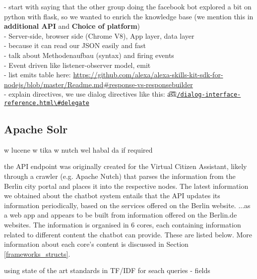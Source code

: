	- start with saying that the other group doing the facebook bot explored a bit on python with flask, so we wanted to enrich the knowledge base (we mention this in \textbf{additional API }and \textbf{Choice of platform})\\
	- Server-side, browser side (Chrome V8), App layer, data layer\\
	- because it can read our JSON easily and fast\\
	- talk about Methodenaufbau (syntax) and firing events\\
	- Event driven like listener-observer model, emit\\
	- list emits table here: \url{https://github.com/alexa/alexa-skills-kit-sdk-for-nodejs/blob/master/Readme.md#response-vs-responsebuilder}\\
	- explain directives, we use dialog directives like this: \t{a\t{sk}}\href{https://developer.amazon.com/docs/custom-skills/dialog-interface-reference.html\#delegate}{\lstinline|/dialog-interface-reference.html\#delegate|}	



\subsection*{Apache Solr}
\label{Solr}
w lucene w tika w nutch wel habal da if required

the API endpoint was originally created for the Virtual Citizen Assistant, likely through a crawler (e.g. Apache Nutch) that parses the information from the Berlin city portal and places it into the respective nodes. The latest information we obtained about the chatbot system entails that the API updates its information periodically, based on the services offered on the Berlin website. 
...as a web app and appears to be built from information offered on the Berlin.de websites. The information is organised in 6 cores, each containing information related to different content the chatbot can provide. These are listed below. More information about each core's content is discussed in Section \ref{frameworks_structs}.


using state of the art standards in TF/IDF for seach queries - fields

